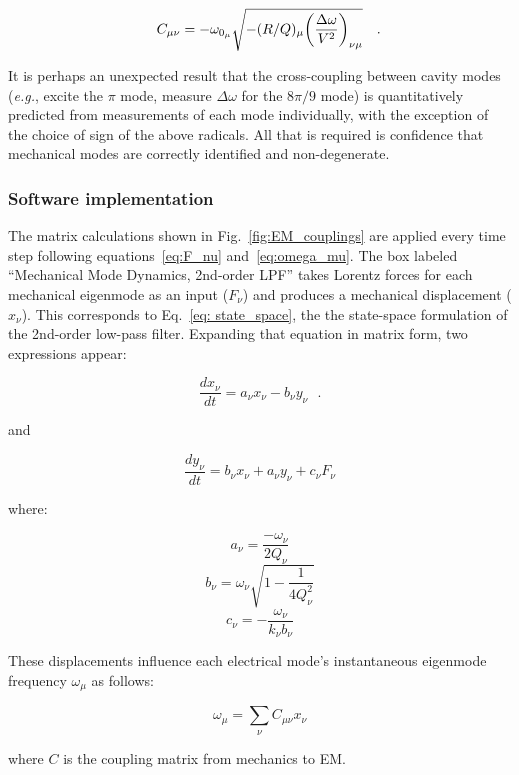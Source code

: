 \documentclass[a4paper,12pt]{article}
\newcommand{\be}{\begin{equation}}
\newcommand{\ee}{\end{equation}}
\begin{document}
\begin{equation}
 C_{\mu\nu} = -\omega_{0_{\mu}} \sqrt{-(R/Q)_{\mu}{ \left(\frac{\Delta \omega}{ V^2}\right)_{\nu \mu}}}\rlap{~~~.}
\end{equation}

It is perhaps an unexpected result that the cross-coupling between cavity modes ({\it e.g.}, excite the $\pi$ mode, measure $\Delta\omega$ for the $8\pi/9$ mode) is quantitatively predicted from measurements of each mode individually, with the exception of the choice of sign of the above radicals.  All that is required is confidence that mechanical modes are correctly identified and non-degenerate.

\subsubsection{Software implementation}

The matrix calculations shown in Fig.~\ref{fig:EM_couplings} are applied every time step following equations~\ref{eq:F_nu} and~\ref{eq:omega_mu}. The box labeled ``Mechanical Mode Dynamics, 2nd-order LPF'' takes Lorentz forces for each mechanical eigenmode as an input ($F_{\nu}$) and produces a mechanical displacement ($x_{\nu}$). This corresponds to Eq.~\ref{eq: state_space}, the the state-space formulation of the 2nd-order low-pass filter. Expanding that equation in matrix form, two expressions appear:

\begin{equation}
  \frac{dx_{\nu}}{dt} = a_{\nu}x_{\nu} - b_{\nu}y_{\nu}~~~.
  \label{eq:dx/dt}
\end{equation}

\noindent and

\begin{equation}
  \frac{dy_{\nu}}{dt} = b_{\nu}x_{\nu} + a_{\nu}y_{\nu} + c_{\nu}F_{\nu}
  \label{eq:dy/dt}
\end{equation}

\noindent where:

\be
a_{\nu} =  \frac{-\omega_{\nu}}{2Q_{\nu}}
\ee
\be
b_{\nu} = \omega_{\nu} \sqrt{1 - \frac{1}{4Q_{\nu}^{2}}}
\ee
\be
c_{\nu} = -\frac{\omega_{\nu}}{k_{\nu}b_{\nu}}
\ee

These displacements influence each electrical mode's instantaneous eigenmode frequency $\omega_{\mu}$ as follows:

\be
\omega_\mu = \sum_\nu C_{\mu\nu} x_\nu
\label{eq:sum_w_mu}
\ee

\noindent where $C$ is the coupling matrix from mechanics to EM.
\end{document}
